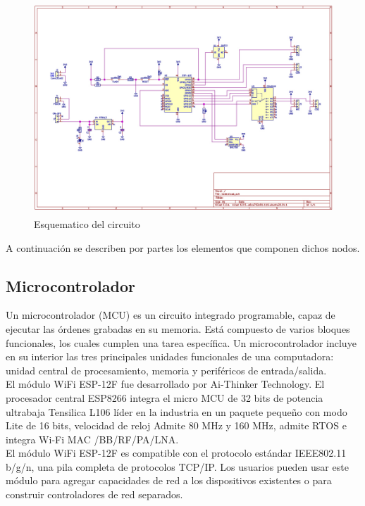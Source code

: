 \begin{figure}[H]
    \centering
    \includegraphics[width=12cm, height=8cm]{imagenes/esquematico nodo.jpg}
    \caption{Esquematico del circuito}
    \label{imag:esquematico_nodo}
\end{figure}

A continuación se describen por partes los elementos que componen dichos nodos.


\subsection{Microcontrolador} \label{sec: microcontrolador}

    Un microcontrolador (MCU) es un circuito integrado programable, capaz de ejecutar las órdenes grabadas en su memoria. Está compuesto de varios bloques funcionales, los cuales cumplen una tarea específica. Un microcontrolador incluye en su interior las tres principales unidades funcionales de una computadora: unidad central de procesamiento, memoria y periféricos de entrada/salida.\\

    El módulo WiFi ESP-12F fue desarrollado por Ai-Thinker Technology. El procesador central ESP8266 integra el micro MCU de 32 bits de potencia ultrabaja Tensilica L106 líder en la industria en un paquete pequeño con modo Lite de 16 bits, velocidad de reloj Admite 80 MHz y 160 MHz, admite RTOS e integra Wi-Fi MAC /BB/RF/PA/LNA.\\

    El módulo WiFi ESP-12F es compatible con el protocolo estándar IEEE802.11 b/g/n, una pila completa de protocolos TCP/IP. Los usuarios pueden usar este módulo para agregar capacidades de red a los dispositivos existentes o para construir controladores de red separados.

